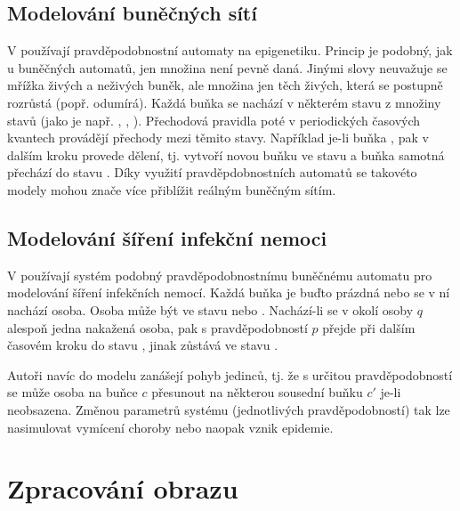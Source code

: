 \documentclass[a4paper,10pt]{article}
\begin{document}
\subsection{Modelování buněčných sítí}

V \cite{MilAtl-ProAuModEpiCelNet} používají pravděpodobnostní automaty na epigenetiku. Princip je podobný, jak u buněčných automatů, jen množina  není pevně daná. Jinými slovy neuvažuje se mřížka živých a neživých buněk, ale množina jen těch živých, která se postupně rozrůstá (popř. odumírá). Každá buňka se nachází v některém stavu z množiny stavů (jako je např. , , ). Přechodová pravidla poté v periodických časových kvantech provádějí přechody mezi těmito stavy. Například je-li buňka , pak v dalším kroku provede dělení, tj. vytvoří novou buňku ve stavu  a buňka samotná přechází do stavu . Díky využití pravděpdobnostních automatů se takovéto modely mohou znače více přiblížit reálným buněčným sítím.

\subsection{Modelování šíření infekční nemoci}
V \cite{BocChe-CriBePrAuNetModSprInfDis+} používají systém podobný pravděpodobnostnímu buněčnému automatu pro modelování šíření infekčních nemocí. Každá buňka je buďto prázdná nebo se v ní nachází osoba. Osoba může být ve stavu  nebo . Nachází-li se v okolí  osoby $q$ alespoň jedna nakažená osoba, pak s pravděpodobností $p$ přejde při dalším časovém kroku do stavu , jinak zůstává ve stavu . 

Autoři navíc do modelu zanášejí pohyb jedinců, tj. že s určitou pravděpodobností se může osoba na buňce $c$ přesunout na některou sousední buňku $c'$ je-li neobsazena. Změnou parametrů systému (jednotlivých pravděpodobností) tak lze nasimulovat vymícení choroby nebo naopak vznik epidemie.

\section{Zpracování obrazu}
\end{document}
